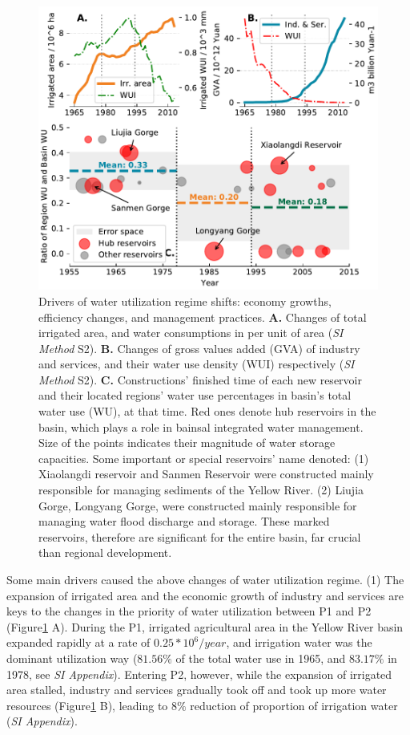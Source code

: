 \documentclass[9pt, twocolumn, twoside, lineno]{pnas-new}
\begin{document}
\begin{figure}%
	\centering
	\includegraphics[width=\linewidth]{../../figures/main/causes.pdf}
	\caption{
		Drivers of water utilization regime shifts: economy growths, efficiency changes, and management practices.
		\textbf{A.} Changes of total irrigated area, and water consumptions in per unit of area (\textit{SI Method} S2).
		\textbf{B.} Changes of gross values added (GVA) of industry and services, and their water use density (WUI) respectively (\textit{SI Method} S2).
		\textbf{C.} Constructions' finished time of each new reservoir and their located regions' water use percentages in basin's total water use (WU), at that time. Red ones denote hub reservoirs in the basin, which plays a role in bainsal integrated water management. Size of the points indicates their magnitude of water storage capacities. Some important or special reservoirs' name denoted: (1) Xiaolangdi reservoir and Sanmen Reservoir were constructed mainly responsible for managing sediments of the Yellow River. (2) Liujia Gorge, Longyang Gorge, were constructed mainly responsible for managing water flood discharge and storage. These marked reservoirs, therefore are significant for the entire basin, far crucial than regional development.
	}
	\label{fig:Causes}
\end{figure}

Some main drivers caused the above changes of water utilization regime.
(1) The expansion of irrigated area and the economic growth of industry and services are keys to the changes in the priority of water utilization between P1 and P2 (Figure\ref{fig:Causes} A). During the P1, irrigated agricultural area in the Yellow River basin expanded rapidly at a rate of $0.25*10^6/year$, and irrigation water was the dominant utilization way ($81.56\%$ of the total water use in 1965, and $83.17\%$ in 1978, see \textit{SI Appendix}). Entering P2, however, while the expansion of irrigated area stalled, industry and services gradually took off and took up more water resources (Figure\ref{fig:Causes} B), leading to $8\%$ reduction of proportion of irrigation water (\textit{SI Appendix}).
\end{document}
